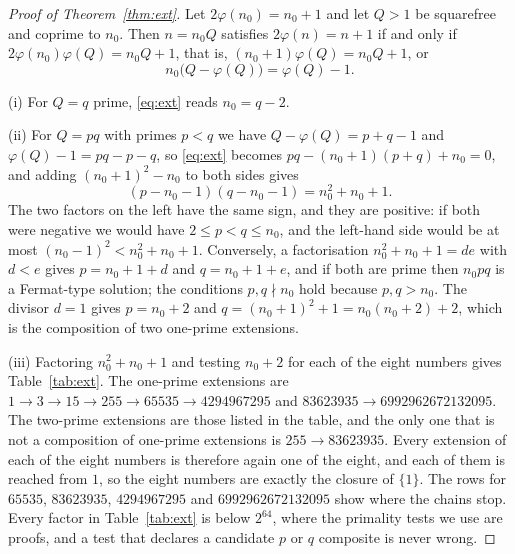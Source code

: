 \documentclass[screen,reqno]{aomart}
\numberwithin{equation}{section}
\theoremstyle{plain}
\theoremstyle{definition}
\theoremstyle{remark}
\begin{document}
\begin{proof}[Proof of Theorem~\ref{thm:ext}]
Let $2\varphi(n_0)=n_0+1$ and let $Q>1$ be squarefree and coprime to
$n_0$. Then $n=n_0Q$ satisfies $2\varphi(n)=n+1$ if and only if
$2\varphi(n_0)\varphi(Q)=n_0Q+1$, that is,
$(n_0+1)\varphi(Q)=n_0Q+1$, or
\begin{equation}\label{eq:ext}
  n_0\bigl(Q-\varphi(Q)\bigr)=\varphi(Q)-1 .
\end{equation}

(i) For $Q=q$ prime, \eqref{eq:ext} reads $n_0=q-2$.

(ii) For $Q=pq$ with primes $p<q$ we have $Q-\varphi(Q)=p+q-1$ and
$\varphi(Q)-1=pq-p-q$, so \eqref{eq:ext} becomes
$pq-(n_0+1)(p+q)+n_0=0$, and adding $(n_0+1)^2-n_0$ to both sides gives
\[
  (p-n_0-1)(q-n_0-1)=n_0^2+n_0+1 .
\]
The two factors on the left have the same sign, and they are
positive: if both were negative we would have $2\le p<q\le n_0$, and the left-hand side would be at most
$(n_0-1)^2<n_0^2+n_0+1$. Conversely, a factorisation
$n_0^2+n_0+1=de$ with $d<e$ gives $p=n_0+1+d$ and $q=n_0+1+e$, and if
both are prime then $n_0pq$ is a Fermat-type solution; the conditions
$p,q\nmid n_0$ hold because $p,q>n_0$. The divisor $d=1$ gives
$p=n_0+2$ and $q=(n_0+1)^2+1=n_0(n_0+2)+2$, which is the composition
of two one-prime extensions.

(iii) Factoring $n_0^2+n_0+1$ and testing $n_0+2$ for each of the
eight numbers gives Table~\ref{tab:ext}. The one-prime extensions are
$1\to3\to15\to255\to65535\to4294967295$ and
$83623935\to6992962672132095$. The two-prime extensions are those
listed in the table, and the only one that is not a composition of
one-prime extensions is $255\to83623935$. Every extension of each of
the eight numbers is therefore again one of the eight, and each of them
is reached from $1$, so the eight numbers are exactly the closure of
$\{1\}$. The rows for $65535$, $83623935$, $4294967295$ and
$6992962672132095$ show where the chains stop. Every factor in
Table~\ref{tab:ext} is below $2^{64}$, where the primality tests we use
are proofs, and a test that declares a candidate $p$ or $q$ composite
is never wrong.
\end{proof}
\end{document}

